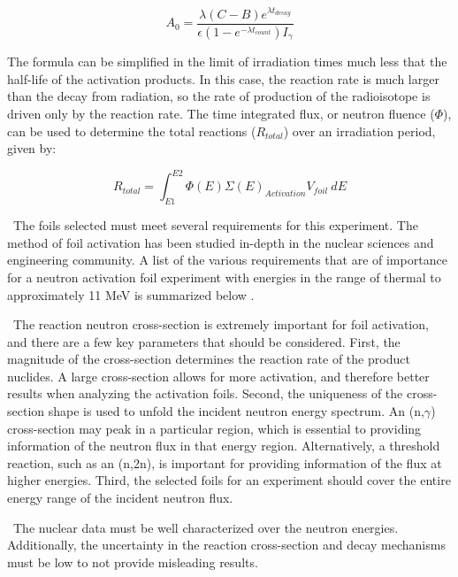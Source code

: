 \documentclass[journal]{IEEEtran}
\begin{document}
	\begin{equation} \label{eq:MeasActivity}
	A_{0} = \frac{\lambda (C-B) e^{\lambda t_{decay}}}{\epsilon (1-e^{-\lambda 
			t_{count}})I_{\gamma}}
	\end{equation}
	
	The formula can be simplified in the limit of irradiation times much less that 
	the half-life of the activation products. In this case, the reaction rate is 
	much larger than the decay from radiation, so the rate of production of the 
	radioisotope is driven only by the reaction rate. The time integrated flux, 
	or neutron fluence ($\Phi$), can be used to determine the total reactions ($R_{total}$)
	over an irradiation period, given by:
	
	\begin{equation} \label{eq:NIFrxnRate}
	R_{total} = \int_{E1}^{E2} \Phi(E) \Sigma(E) _{Activation} V_{foil} 
	\:dE 
	\end{equation}
	
	\ The foils selected must meet several requirements for this experiment. 
The method of foil activation has been studied in-depth in the nuclear sciences and engineering community. 
A list of the various requirements that are of importance for a neutron activation foil experiment with energies in the range of thermal to approximately 11 MeV is summarized below \cite{Knoll,Luciano2012a,Kuijpers1977}.
	
	\ The reaction neutron cross-section is extremely important for foil 
	activation, and there are a few key parameters that should be considered. 
	First, the magnitude of the cross-section determines the 
	reaction rate of the product nuclides. A large cross-section allows for 
	more activation, and therefore better results when analyzing the activation 
	foils. Second, the uniqueness of the cross-section shape is used to unfold 
	the incident neutron energy spectrum. An (n,$\gamma$) cross-section may 
	peak in a particular region, which is essential to providing information of the 
	neutron flux in that energy region. Alternatively, a threshold reaction, 
	such as an (n,2n), is important for providing information of the flux at 
	higher energies. Third, the selected foils for an experiment should cover  
	the entire energy range of the incident neutron flux. 
	
	\ The nuclear data must be well characterized over the neutron 
	energies. Additionally, the uncertainty in the reaction cross-section and 
	decay mechanisms must be low to not provide misleading results. 
	
\end{document}
